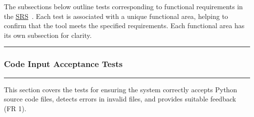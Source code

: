 \documentclass[12pt, titlepage]{article}
\newcommand{\SRS}{\href{https://github.com/ssm-lab/capstone--source-code-optimizer/blob/main/docs/SRS/SRS.pdf}{SRS}}
\newcommand{\colorrule}{\textcolor{BlueViolet}{\rule{\linewidth}{2pt}}}
\begin{document}
The subsections below outline tests corresponding to functional
requirements in the \SRS~\cite{SRS}. Each test is associated with a
unique functional area, helping to confirm that the tool meets the
specified requirements. Each functional area has its own subsection for clarity.

\noindent
\colorrule

\subsubsection{Code Input Acceptance Tests}
\colorrule

\medskip

\noindent
This section covers the tests for ensuring the system correctly
accepts Python source code files, detects errors in invalid files,
and provides suitable feedback (FR 1).
\end{document}
